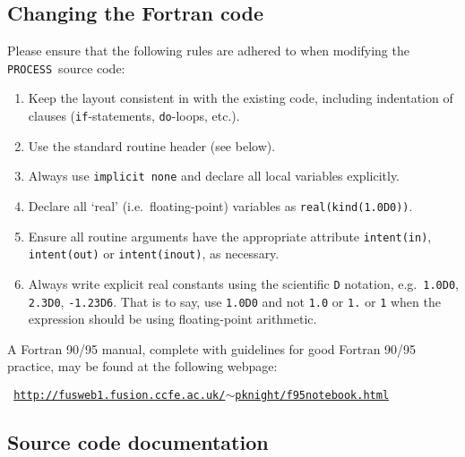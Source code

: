 \documentclass[11pt,a4paper]{report}
\newcommand{\process}{\mbox{\texttt{PROCESS}}}
\begin{document}
\subsection{Changing the Fortran code}

Please ensure that the following rules are adhered to when modifying the
\process\ source code:

\begin{enumerate}

\item Keep the layout consistent in with the existing code,
  including indentation of clauses (\texttt{if}-statements, \texttt{do}-loops,
  etc.).

\item Use the standard routine header (see below).

\item Always use \verb+implicit none+ and declare all local variables
  explicitly.

\item Declare all `real' (i.e.\ floating-point) variables as
  \texttt{real(kind(1.0D0))}.

\item Ensure all routine arguments have the appropriate attribute \texttt{intent(in)},
  \texttt{intent(out)} or \texttt{intent(inout)}, as necessary.

\item Always write explicit real constants using the scientific \texttt{D}
  notation, e.g.\ \texttt{1.0D0}, \texttt{2.3D0}, \texttt{-1.23D6}. That is to
  say, use \texttt{1.0D0} and not \texttt{1.0} or \texttt{1.} or \texttt{1} when the
  expression should be using floating-point arithmetic.

\end{enumerate}

A Fortran 90/95 manual, complete with guidelines for good Fortran 90/95
practice, may be found at the following webpage:
\begin{center}
\texttt{
\href{http://fusweb1.fusion.ccfe.ac.uk/~pknight/f95notebook.html}
{http://fusweb1.fusion.ccfe.ac.uk/$\sim$pknight/f95notebook.html}
}
\end{center}

\subsection{Source code documentation}
\end{document}
